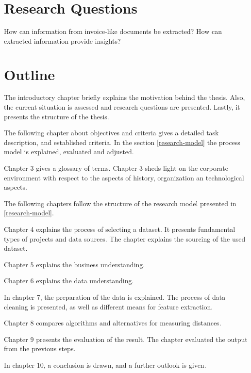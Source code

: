 \section{Research Questions}
\label{research-q}
How can information from invoice-like documents be extracted?
How can extracted information provide insights?

\section{Outline}
The introductory chapter briefly explains the motivation behind the thesis. Also, the current situation is assessed and research questions are presented. Lastly, it presents the structure of the thesis.

The following chapter about objectives and criteria gives a detailed task description, and established criteria. In the section \ref{research-model} the process model is explained, evaluated and adjusted.

Chapter 3 gives a glossary of terms. Chapter 3 sheds light on the corporate environment with respect to the aspects of history, organization an technological aspects. 

The following chapters follow the structure of the research model presented in \ref{research-model}.

Chapter 4 explains the process of selecting a dataset. It presents fundamental types of projects and data sources. The chapter explains the sourcing of the used dataset.

Chapter 5 explains the business understanding.

Chapter 6 explains the data understanding.

In chapter 7, the preparation of the data is explained. The process of data cleaning is presented, as well as different means for feature extraction.

Chapter 8 compares algorithms and alternatives for measuring distances.

Chapter 9 presents the evaluation of the result. The chapter evaluated the output from the previous steps.

In chapter 10, a conclusion is drawn, and a further outlook is given.